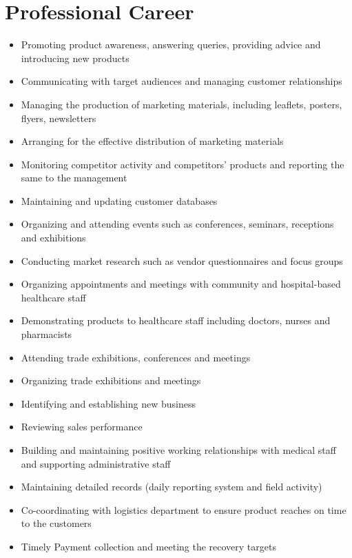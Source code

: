 \documentclass[11pt,a4paper,sans]{moderncv} %
\begin{document}
\section{Professional Career}
         {\begin{itemize}
           \item Promoting product awareness, answering queries, providing advice and introducing new products
           \item Communicating with target audiences and managing customer relationships
           \item Managing the production of marketing materials, including leaflets, posters, flyers, newsletters
           \item Arranging for the effective distribution of marketing materials
           \item Monitoring competitor activity and competitors' products and reporting the same to the management
           \item Maintaining and updating customer databases
           \item Organizing and attending events such as conferences, seminars, receptions and exhibitions
           \item Conducting market research such as vendor questionnaires and focus groups
         \end{itemize}}
         {\begin{itemize}
           \item Organizing appointments and meetings with community and hospital-based healthcare staff
           \item Demonstrating products to healthcare staff including doctors, nurses and pharmacists
           \item Attending trade exhibitions, conferences and meetings
           \item Organizing trade exhibitions and meetings
           \item Identifying and establishing new business
           \item Reviewing sales performance
           \item Building and maintaining positive working relationships with medical staff and supporting administrative staff
           \item Maintaining detailed records (daily reporting system and field activity)
           \item Co-coordinating with logistics department to ensure product reaches on time to the customers
           \item Timely Payment collection and meeting the recovery targets
         \end{itemize}}
\end{document}
